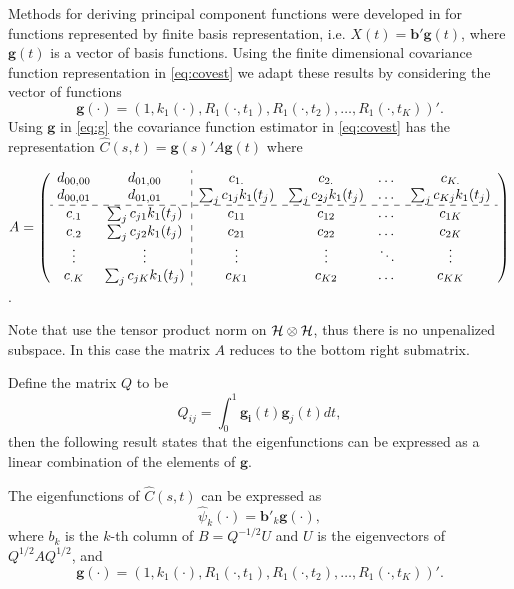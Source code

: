 Methods for deriving principal component functions were developed in \cite{FDA} for functions represented by finite basis representation, i.e. $X(t) = \mathbf{b}'\mathbf{g}(t)$, where $\mathbf{g}(t)$ is a vector of basis functions. Using the finite dimensional covariance function representation in \eqref{eq:covest} we adapt these results by considering the vector of functions 
\begin{equation}
	\mathbf{g(\cdot)}=(1, k_1(\cdot),R_{1}(\cdot, t_1),R_{1}(\cdot, t_2),\dots, R_{1}(\cdot, t_K))'. \label{eq:g} 
\end{equation}
Using $\mathbf{g}$ in \eqref{eq:g} the covariance function estimator in \eqref{eq:covest} has the representation $\hat{C}(s,t)= \mathbf{g}(s)'A\mathbf{g}(t)$ where \vspace{0.8cm} 
\begin{center}
	$A = \left( 
	\begin{array}{cc:cccc}
		d_{00,00} & d_{01,00} & c_{1.} & c_{2.} & \dots & c_{K.}\\
		d_{00,01} & d_{01,01} & \sum_j c_{1j}k_1(t_j) & \sum_j c_{2j}k_1(t_j) & \dots & \sum_j c_{Kj}k_1(t_j)\\
		\hdashline c_{.1} & \sum_j c_{j1}k_1(t_j) & c_{11} & c_{12} & \dots & c_{1K}\\
		c_{.2} & \sum_j c_{j2}k_1(t_j) & c_{21} & c_{22} & \dots & c_{2K}\\
		\vdots & \vdots & \vdots & \vdots & \ddots & \vdots \\
		c_{.K} & \sum_j c_{jK}k_1(t_j) & c_{K1} & c_{K2} & \dots & c_{KK} 
	\end{array}
	\right)$. 
\end{center}
\vspace{0.8cm} Note that \cite{Cai:2010vr} use the tensor product norm on $\mathcal{H}\otimes \mathcal{H}$, thus there is no unpenalized subspace. In this case the matrix $A$ reduces to the bottom right submatrix. 

Define the matrix $Q$ to be 
\begin{equation*}
	Q_{ij} = \int_0^1\mathbf{g_i}(t)\mathbf{g}_j(t)dt, 
\end{equation*}
then the following result states that the eigenfunctions can be expressed as a linear combination of the elements of $\mathbf{g}$. 
\begin{lemma}
	\label{thm:eigenfunctions} The eigenfunctions of $\hat{C}(s,t)$ can be expressed as 
	\begin{equation*}
		\hat{\psi}_k(\cdot) = \mathbf{b}'_k\mathbf{g}(\cdot), 
	\end{equation*}
	where $b_k$ is the $k$-th column of $B=Q^{-1/2}U$ and $U$ is the eigenvectors of $Q^{1/2}AQ^{1/2}$, and
	\[ \mathbf{g(\cdot)}=(1, k_1(\cdot),R_{1}(\cdot, t_1),R_{1}(\cdot, t_2),\dots, R_{1}(\cdot, t_K))'. \]
\end{lemma}

